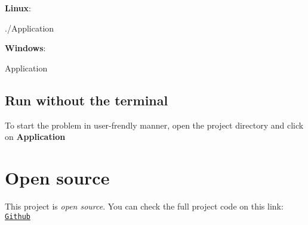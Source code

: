 {\bfseries Linux}\+:
\begin{DoxyCode}
./Application 
\end{DoxyCode}
 {\bfseries Windows}\+:
\begin{DoxyCode}
Application 
\end{DoxyCode}
\hypertarget{index_run_user_frendly}{}\subsection{Run without the terminal}\label{index_run_user_frendly}
To start the problem in user-\/frendly manner, open the project directory and click on {\bfseries Application}\hypertarget{index_open_source}{}\section{Open source}\label{index_open_source}
This project is {\itshape open source}. You can check the full project code on this link\+: \href{https://github.com/DenisLapi/graph_coloring}{\tt Github} 